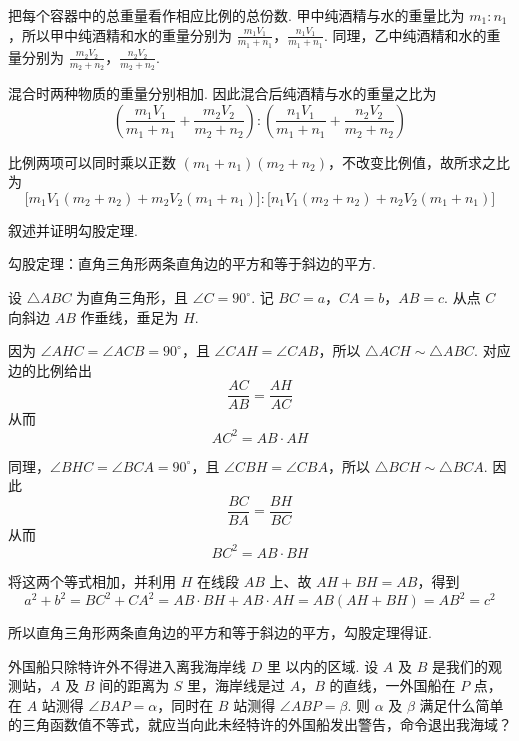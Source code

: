 \begin{solution}
把每个容器中的总重量看作相应比例的总份数. 甲中纯酒精与水的重量比为 \(m_1:n_1\)，所以甲中纯酒精和水的重量分别为
\(\frac{m_1V_1}{m_1+n_1}\)，\(\frac{n_1V_1}{m_1+n_1}\).
同理，乙中纯酒精和水的重量分别为
\(\frac{m_2V_2}{m_2+n_2}\)，\(\frac{n_2V_2}{m_2+n_2}\).

混合时两种物质的重量分别相加. 因此混合后纯酒精与水的重量之比为
\[
\left(\frac{m_{1}V_{1}}{m_{1}+n_{1}}+\frac{m_{2}V_{2}}{m_{2}+n_{2}}\right):\left(\frac{n_{1}V_{1}}{m_{1}+n_{1}}+\frac{n_{2}V_{2}}{m_{2}+n_{2}}\right)
\]

比例两项可以同时乘以正数 \(\left(m_1+n_1\right)\left(m_2+n_2\right)\)，不改变比例值，故所求之比为
\[
\bigl[m_{1}V_{1}(m_{2}+n_{2})+m_{2}V_{2}(m_{1}+n_{1})\bigr]:\bigl[n_{1}V_{1}(m_{2}+n_{2})+n_{2}V_{2}(m_{1}+n_{1})\bigr]
\]
\end{solution}

\begin{problem}
叙述并证明勾股定理.
\end{problem}

\begin{solution}
勾股定理：直角三角形两条直角边的平方和等于斜边的平方.

设 \(\triangle ABC\) 为直角三角形，且 \(\angle C=90^{\circ}\). 记
\(BC=a\)，\(CA=b\)，\(AB=c\).
从点 \(C\) 向斜边 \(AB\) 作垂线，垂足为 \(H\).

因为 \(\angle AHC=\angle ACB=90^{\circ}\)，且 \(\angle CAH=\angle CAB\)，所以
\(
 \triangle ACH\sim\triangle ABC
\).
对应边的比例给出
\[
\frac{AC}{AB}=\frac{AH}{AC}
\]
从而
\[
AC^2=AB\cdot AH
\]

同理，\(\angle BHC=\angle BCA=90^{\circ}\)，且 \(\angle CBH=\angle CBA\)，所以
\(\triangle BCH\sim\triangle BCA\).
因此
\[
\frac{BC}{BA}=\frac{BH}{BC}
\]
从而
\[
BC^2=AB\cdot BH
\]

将这两个等式相加，并利用 \(H\) 在线段 \(AB\) 上、故 \(AH+BH=AB\)，得到
\[
a^{2}+b^{2}=BC^{2}+CA^{2}=AB\cdot BH+AB\cdot AH=AB\left(AH+BH\right)=AB^{2}=c^{2}
\]

所以直角三角形两条直角边的平方和等于斜边的平方，勾股定理得证.
\end{solution}

\begin{problem}
外国船只除特许外不得进入离我海岸线 \(D\text{ 里}\) 以内的区域. 设 \(A\) 及 \(B\) 是我们的观测站，\(A\) 及 \(B\) 间的距离为 \(S\text{ 里}\)，海岸线是过 \(A\)，\(B\) 的直线，一外国船在 \(P\) 点，在 \(A\) 站测得 \(\angle BAP=\alpha\)，同时在 \(B\) 站测得 \(\angle ABP=\beta\). 则 \(\alpha\) 及 \(\beta\) 满足什么简单的三角函数值不等式，就应当向此未经特许的外国船发出警告，命令退出我海域？
\end{problem}

